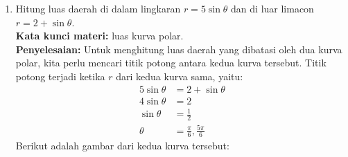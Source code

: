 \documentclass[10pt,openany,a4paper]{article}
\theoremstyle{definition}
\theoremstyle{definition}
\theoremstyle{plain}
\newenvironment{jawab}[2][tes]{
\textbf{Kata kunci materi:} #1.\\
\textbf{Penyelesaian:} #2
}{}
\newenvironment{jawaban}[2][tes]{
\colorlet{oldcolor}{.}
        \color{red}
        \setlength{\fboxrule}{1pt}\boxed{\color{oldcolor}#2}\color{oldcolor}.
}{}
\begin{document}
\begin{enumerate}
\begin{jawab}[luas kurva polar]
{\begin{align*}
\end{align*}
            Luas daerah yang dibatasi oleh kedua kurva tersebut adalah luas daerah di dalam lingkaran $r=4$ dikurangi dengan luas daerah di dalam kardioda $r=2-2\cos\theta$. Jelas bahwa luas lingkaran adalah $L=\pi r^2 = 16\pi$. Selanjutnya, kita hitung luas kardioda dengan menggunakan rumus luas kurva polar:
            \begin{align*}
L &= \int_0^{2\pi} \frac{1}{2}(2-2\cos \theta)^2 \, d\theta\\
&= \frac{1}{2} \int_0^{2\pi} 4(1-\cos \theta)^2 \, d\theta\\
&= 2 \int_0^{2\pi} (1 - 2\cos \theta + \cos^2 \theta) \, d\theta\\
&= 2 \int_0^{2\pi} \left(1 - 2\cos \theta + \frac{1 + \cos(2\theta)}{2}\right) \, d\theta\\
&= 2 \int_0^{2\pi} \left(\frac{3}{2} - 2\cos \theta + \frac{\cos(2\theta)}{2}\right) \, d\theta\\
&= 2 \left[\frac{3}{2}\theta - 2\sin \theta + \frac{\sin(2\theta)}{4}\right]_0^{2\pi}\\
&= 6\pi.
            \end{align*}
            Jadi luas daerah yang dibatasi oleh kedua kurva tersebut adalah:
            \begin{align*}
L &= 16\pi - 6\pi=\begin{jawaban}{10\pi}\end{jawaban}
                \end{align*}
            }
            \end{jawab}
            \item Hitung luas daerah di dalam lingkaran $r=5\sin\theta$ dan di luar limacon $r=2+\sin\theta$.\\
            \begin{jawab}[luas kurva polar]{
                Untuk menghitung luas daerah yang dibatasi oleh dua kurva polar, kita perlu mencari titik potong antara kedua kurva tersebut. Titik potong terjadi ketika $r$ dari kedua kurva sama, yaitu:
\begin{align*}
5\sin \theta &= 2 + \sin \theta\\
4\sin \theta &= 2\\
\sin \theta &= \frac{1}{2}\\
\theta &= \frac{\pi}{6}, \frac{5\pi}{6}
\end{align*}
Berikut adalah gambar dari kedua kurva tersebut:
            \begin{center}
                \begin{tikzpicture}

\end{tikzpicture}
\end{center}}
\end{jawab}
\end{enumerate}
\end{document}
